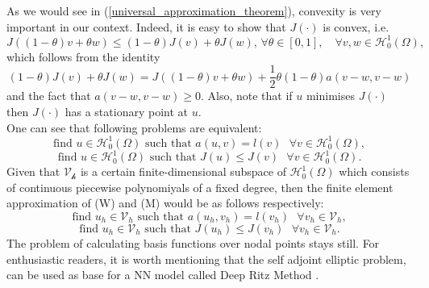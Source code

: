 As we would see in (\ref{universal_approximation_theorem}), convexity is very important in our context. Indeed, it is easy to show that $J(\cdot)$ is convex, i.e.
\begin{equation*}
J((1-\theta)v + \theta w) \leq (1-\theta) J(v) + \theta J(w) \text{,     }\forall \theta \in [0,1], \quad\forall v,w \in \mathscr{H}_{0}^{1}(\Omega),
\end{equation*}
which follows from the identity
\begin{equation*}
(1-\theta) J(v) + \theta J(w) = J((1-\theta)v + \theta w) + \frac{1}{2} \theta(1-\theta) a(v-w,v-w)
\end{equation*}
and the fact that $ a(v-w,v-w) \geq 0$. Also, note that if $u$ minimises $J(\cdot)$ then $J(\cdot)$ has a stationary point at $u$.\\
One can see that following problems are equivalent:
\begin{equation*}
\tag{W}
\text{find }u\in  \mathscr{H}_{0}^{1}(\Omega) \text{ such that } a(u,v) = l(v) \text{    }\forall v \in \mathscr{H}_{0}^{1}(\Omega),
\end{equation*}
\begin{equation*}
\tag{M}
\text{find }u\in  \mathscr{H}_{0}^{1}(\Omega) \text{ such that } J(u) \leq J(v) \text{    }\forall v \in \mathscr{H}_{0}^{1}(\Omega).
\end{equation*}
Given that $\mathscr{V_h}$ is a certain finite-dimensional subspace of $\mathscr{H}_{0}^{1}(\Omega)$ which consists of continuous piecewise polynomiyals of a fixed degree, then the finite element approximation of (W) and (M) would be as follows respectively:
\begin{equation*}
\tag{$W_h$}
\text{find }u_h\in  \mathscr{V}_h \text{ such that } a(u_h,v_h) = l(v_h) \text{    }\forall v_h \in \mathscr{V}_h,
\end{equation*}
\begin{equation*}
\tag{$M_h$}
\text{find }u_h\in  \mathscr{V}_h \text{ such that } J(u_h) \leq J(v_h) \text{    }\forall v_h \in \mathscr{V}_h.
\end{equation*}
The problem of calculating basis functions over nodal points stays still. For enthusiastic readers, it is worth mentioning that the self adjoint elliptic problem, can be used as base for a NN model called Deep Ritz Method \cite{weinan2018deep}.%
